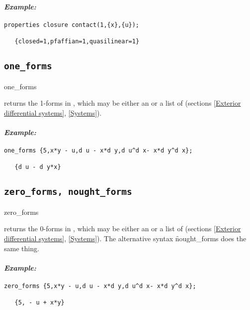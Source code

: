 \paragraph{\it Example:}
\begin{verbatim}
properties closure contact(1,{x},{u});

   {closed=1,pfaffian=1,quasilinear=1}
\end{verbatim}


\subsection{\tt one\_forms}
\label{one_forms}

\begin{syntax}
	one\_forms 
\end{syntax}
returns the 1-forms in , which may be either an  or a
list of  (sections \ref{Exterior differential systems},
\ref{Systems}).

\paragraph{\it Example:}
\begin{verbatim}
one_forms {5,x*y - u,d u - x*d y,d u^d x- x*d y^d x};

   {d u - d y*x} 
\end{verbatim}

\subsection{\tt zero\_forms, nought\_forms}
\label{zero_forms}

\begin{syntax}
	zero\_forms 
\end{syntax}
returns the 0-forms in , which may be either an  or a
list of  (sections \ref{Exterior differential systems},
\ref{Systems}). The alternative syntax \f{nought\_forms} does the same thing.

\paragraph{\it Example:}
\begin{verbatim}
zero_forms {5,x*y - u,d u - x*d y,d u^d x- x*d y^d x};

   {5, - u + x*y} 
\end{verbatim}


